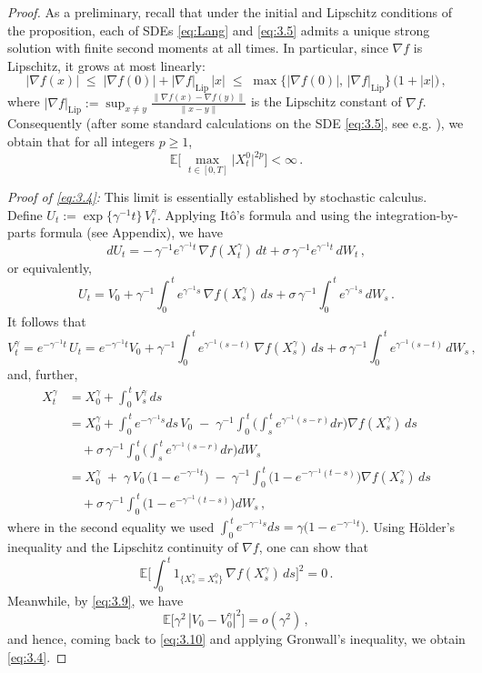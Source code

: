 \documentclass[12pt]{article}
\numberwithin{equation}{section}
\theoremstyle{remark}
\begin{document}
\begin{proof}
As a preliminary, recall that under the initial and Lipschitz conditions of the proposition, each of SDEs \eqref{eq:Lang} and \eqref{eq:3.5} admits a unique strong solution with finite second moments at all times. In particular, since $\nabla f$ is Lipschitz, it grows at most linearly: 
\[ 
|\nabla f(x)| \;\le\; |\nabla f(0)| + |\nabla f|_{\text{Lip}}\,|x| \;\le\; \max\{|\nabla f(0)|,\,|\nabla f|_{\text{Lip}}\}\,\big(1 + |x|\big)\,, 
\tag{3.7}
\] 
where $|\nabla f|_{\text{Lip}} := \sup_{x \neq y}\frac{\|\nabla f(x) - \nabla f(y)\|}{\|x - y\|}$ is the Lipschitz constant of $\nabla f$. Consequently (after some standard calculations on the SDE \eqref{eq:3.5}, see e.g. \cite{Karatzas1991}), we obtain that for all integers $p \ge 1$, 
\[ 
\mathbb{E}\!\Big[\,\max_{\,t \in [0,T]} \big|X_t^0\big|^{2p}\Big] < \infty\,.
\tag{3.8}
\] 

\noindent \textit{Proof of \eqref{eq:3.4}:} This limit is essentially established by stochastic calculus. Define $U_t := \exp\{\gamma^{-1}t\}\,V_t^\gamma$. Applying Itô’s formula and using the integration-by-parts formula (see Appendix), we have 
\[ 
dU_t = -\,\gamma^{-1}e^{\gamma^{-1}t}\,\nabla f(X_t^\gamma)\,dt + \sigma\,\gamma^{-1}e^{\gamma^{-1}t}\,dW_t\,,
\] 
or equivalently, 
\[ 
U_t = V_0 + \gamma^{-1}\int_{0}^{\,t} e^{\gamma^{-1}s}\,\nabla f(X_s^\gamma)\,ds + \sigma\,\gamma^{-1}\int_{0}^{\,t} e^{\gamma^{-1}s}\,dW_s\,.
\] 
It follows that 
\[ 
V_t^\gamma = e^{-\gamma^{-1}t}\,U_t = e^{-\gamma^{-1}t}V_0 + \gamma^{-1}\int_{0}^{\,t} e^{\gamma^{-1}(s - t)}\,\nabla f(X_s^\gamma)\,ds + \sigma\,\gamma^{-1}\int_{0}^{\,t} e^{\gamma^{-1}(s - t)}\,dW_s\,,
\tag{3.9}
\] 
and, further, 
\begin{align}
X_t^\gamma &= X_0^\gamma + \int_{0}^{\,t} V_s^\gamma\,ds \nonumber\\
&= X_0^\gamma + \int_{0}^{\,t} e^{-\gamma^{-1}s}ds\,V_0 \;-\; \gamma^{-1}\int_{0}^{\,t} \Bigg(\int_{s}^{\,t} e^{\gamma^{-1}(s-r)}dr\Bigg)\nabla f(X_s^\gamma)\,ds \nonumber\\ 
&\quad + \sigma\,\gamma^{-1}\int_{0}^{\,t} \Bigg(\int_{s}^{\,t} e^{\gamma^{-1}(s-r)}dr\Bigg) dW_s \nonumber\\ 
&= X_0^\gamma \;+\; \gamma\,V_0\,\big(1 - e^{-\gamma^{-1}t}\big) \;-\; \gamma^{-1}\int_{0}^{\,t} \Big(1 - e^{-\gamma^{-1}(t-s)}\Big)\nabla f(X_s^\gamma)\,ds \nonumber\\ 
&\quad + \sigma\,\gamma^{-1}\int_{0}^{\,t} \Big(1 - e^{-\gamma^{-1}(t-s)}\Big) dW_s\,,
\tag{3.10}
\end{align}
where in the second equality we used $\int_{0}^{\,t} e^{-\gamma^{-1}s}ds = \gamma\big(1 - e^{-\gamma^{-1}t}\big)$. Using Hölder’s inequality and the Lipschitz continuity of $\nabla f$, one can show that 
\[ 
\mathbb{E}\!\Bigg[\int_{0}^{\,t} 1_{\{X_s^\gamma = X_s^0\}}\,\nabla f(X_s^\gamma)\,ds\Bigg]^2 = 0\,.
\] 
Meanwhile, by \eqref{eq:3.9}, we have 
\[ 
\mathbb{E}\big[\gamma^2\,|V_0 - V_0^\gamma|^2\big] = o(\gamma^2)\,,
\] 
and hence, coming back to \eqref{eq:3.10} and applying Gronwall’s inequality, we obtain \eqref{eq:3.4}.


\end{proof}
\end{document}
